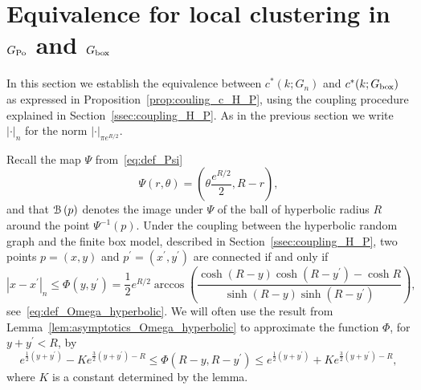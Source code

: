 \section{Equivalence for local clustering in $G_{{\mathrm{Po}}}$ and $G_{\mathrm{box}}$}\label{sec:coupling_H_P_n}

In this section we establish the equivalence between $c^\ast(k; G_n)$ and $c^\ast(k; G_{\mathrm{box}})$ as expressed in Proposition~\ref{prop:couling_c_H_P}, using the coupling procedure explained in Section~\ref{ssec:coupling_H_P}. As in the previous section we write $|\cdot|_n$ for the norm $|\cdot|_{\pi e^{R/2}}$.

%
%

Recall the map $\Psi$ from~\eqref{eq:def_Psi}
\[
	\Psi(r,\theta) = \left(\theta \frac{e^{R/2}}{2}, R - r\right),
\] 
and that ${\mathcal B}\left(p\right)$ denotes the image under $\Psi$ of the ball of hyperbolic radius $R$ around the point $\Psi^{-1}(p)$. Under the coupling between the hyperbolic random graph and the finite box model, described in Section~\ref{ssec:coupling_H_P}, two points $p = (x,y)$ and $p^\prime = (x^\prime, y^\prime)$ are connected if and only if
\[
	|x-x^\prime|_n \le \Phi(y, y^\prime)
	= \frac{1}{2}e^{R/2} \arccos\left( \frac{\cosh(R-y) \cosh(R-y^\prime) - \cosh R}{\sinh(R-y) \sinh(R-y^\prime)} \right),
\]
see~\eqref{eq:def_Omega_hyperbolic}. We will often use the result from Lemma~\ref{lem:asymptotics_Omega_hyperbolic} to approximate the function $\Phi$, for $y + y^\prime < R$, by  
\[
	e^{\frac{1}{2}(y+y^\prime)} - K e^{\frac{3}{2}(y+y^\prime) - R} \leq \Phi(R - y, R - y^\prime) 
		\leq  e^{\frac{1}{2}(y+y^\prime)} + K e^{\frac{3}{2}(y+y^\prime) - R},
\]
where $K$ is a constant determined by the lemma.

